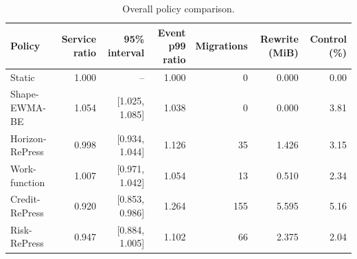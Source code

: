 \begin{table}[!t]
\centering\small
\caption{Overall policy comparison.}
\label{tab:newresults}
\begin{tabular}{@{}lrrrrrr@{}}
\toprule
Policy & Service ratio & 95\% interval & Event p99 ratio & Migrations & Rewrite (MiB) & Control (\%) \\
\midrule
Static & 1.000 & -- & 1.000 & 0 & 0.000 & 0.00 \\
Shape-EWMA-BE & 1.054 & [1.025, 1.085] & 1.038 & 0 & 0.000 & 3.81 \\
Horizon-RePress & 0.998 & [0.934, 1.044] & 1.126 & 35 & 1.426 & 3.15 \\
Work-function & 1.007 & [0.971, 1.042] & 1.054 & 13 & 0.510 & 2.34 \\
Credit-RePress & 0.920 & [0.853, 0.986] & 1.264 & 155 & 5.595 & 5.16 \\
Risk-RePress & 0.947 & [0.884, 1.005] & 1.102 & 66 & 2.375 & 2.04 \\
\bottomrule
\end{tabular}
\end{table}

